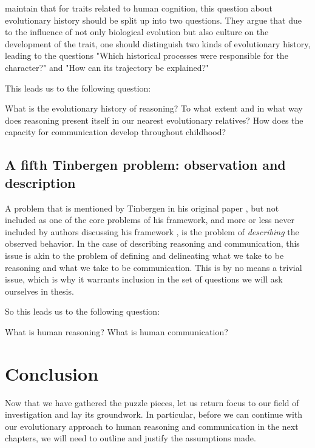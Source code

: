 \citet{BatesonLaland13} maintain that for traits related to human cognition, this question about evolutionary history should be split up into two questions. They argue that due to the influence of not only biological evolution but also culture on the development of the trait, one should distinguish two kinds of evolutionary history, leading to the questions "Which historical processes were responsible for the character?" and "How can its trajectory be explained?" \citep[p.~714]{BatesonLaland13}

This leads us to the following question:

\begin{exe}
    \ex
    \begin{xlist}
        \ex What is the evolutionary history of reasoning? To what extent and in what way does reasoning present itself in our nearest evolutionary relatives?
        \ex How does the capacity for communication develop throughout childhood?
    \end{xlist}
\end{exe}

\subsection{A fifth Tinbergen problem: observation and description}
A problem that is mentioned by Tinbergen in his original paper \citeyear{Tinbergen63}, but not included as one of the core problems of his framework, and more or less never included by authors discussing his framework \citep{LB02, Laland13, AllenBekoff95}, is the problem of \emph{describing} the observed behavior.
In the case of describing reasoning and communication, this issue is akin to the problem of defining and delineating what we take to be reasoning and what we take to be communication. This is by no means a trivial issue, which is why it warrants inclusion in the set of questions we will ask ourselves in thesis.

So this leads us to the following question:

\begin{exe}
    \ex
    \begin{xlist}
        \ex What is human reasoning?
        \ex What is human communication?
    \end{xlist}
\end{exe}

\section{Conclusion}
\label{sec:evo-conclusion}
Now that we have gathered the puzzle pieces, let us return focus to our field of investigation and lay its groundwork. In particular, before we can continue with our evolutionary approach to human reasoning and communication in the next chapters, we will need to outline and justify the assumptions made.

